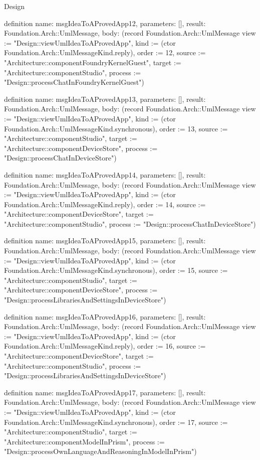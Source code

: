 \begin{lexlean}{Design}
\begin{semanticmodule}
definition{
  name: msgIdeaToAProvedApp12,
  parameters: [],
  result: Foundation.Arch::UmlMessage,
  body: (record Foundation.Arch::UmlMessage {view := "Design::viewUmlIdeaToAProvedApp", kind := (ctor Foundation.Arch::UmlMessageKind.reply), order := 12, source := "Architecture::componentFoundryKernelGuest", target := "Architecture::componentStudio", process := "Design::processChatInFoundryKernelGuest"})
}

definition{
  name: msgIdeaToAProvedApp13,
  parameters: [],
  result: Foundation.Arch::UmlMessage,
  body: (record Foundation.Arch::UmlMessage {view := "Design::viewUmlIdeaToAProvedApp", kind := (ctor Foundation.Arch::UmlMessageKind.synchronous), order := 13, source := "Architecture::componentStudio", target := "Architecture::componentDeviceStore", process := "Design::processChatInDeviceStore"})
}

definition{
  name: msgIdeaToAProvedApp14,
  parameters: [],
  result: Foundation.Arch::UmlMessage,
  body: (record Foundation.Arch::UmlMessage {view := "Design::viewUmlIdeaToAProvedApp", kind := (ctor Foundation.Arch::UmlMessageKind.reply), order := 14, source := "Architecture::componentDeviceStore", target := "Architecture::componentStudio", process := "Design::processChatInDeviceStore"})
}

definition{
  name: msgIdeaToAProvedApp15,
  parameters: [],
  result: Foundation.Arch::UmlMessage,
  body: (record Foundation.Arch::UmlMessage {view := "Design::viewUmlIdeaToAProvedApp", kind := (ctor Foundation.Arch::UmlMessageKind.synchronous), order := 15, source := "Architecture::componentStudio", target := "Architecture::componentDeviceStore", process := "Design::processLibrariesAndSettingsInDeviceStore"})
}

definition{
  name: msgIdeaToAProvedApp16,
  parameters: [],
  result: Foundation.Arch::UmlMessage,
  body: (record Foundation.Arch::UmlMessage {view := "Design::viewUmlIdeaToAProvedApp", kind := (ctor Foundation.Arch::UmlMessageKind.reply), order := 16, source := "Architecture::componentDeviceStore", target := "Architecture::componentStudio", process := "Design::processLibrariesAndSettingsInDeviceStore"})
}

definition{
  name: msgIdeaToAProvedApp17,
  parameters: [],
  result: Foundation.Arch::UmlMessage,
  body: (record Foundation.Arch::UmlMessage {view := "Design::viewUmlIdeaToAProvedApp", kind := (ctor Foundation.Arch::UmlMessageKind.synchronous), order := 17, source := "Architecture::componentStudio", target := "Architecture::componentModelInPrism", process := "Design::processOwnLanguageAndReasoningInModelInPrism"})
}


\end{semanticmodule}
\end{lexlean}
